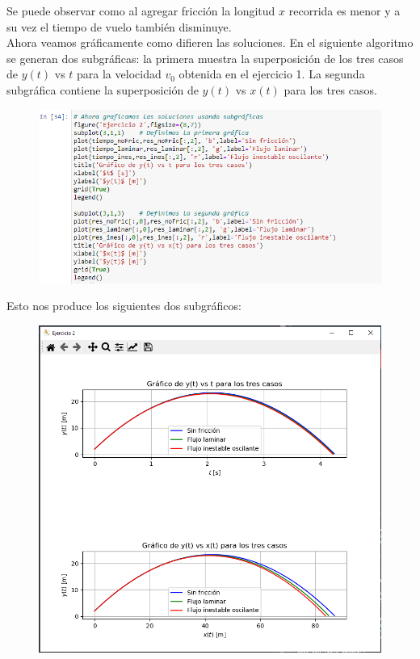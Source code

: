 \documentclass[11pt]{article}
\begin{document}
	Se puede observar como al agregar fricción la longitud $x$ recorrida es menor y a su vez el tiempo de vuelo también disminuye. \\
	Ahora veamos gráficamente como difieren las soluciones. En el siguiente algoritmo se generan dos subgráficas: la primera muestra la superposición de los tres casos de $y(t)$ vs $t$ para la velocidad $v_0$ obtenida en el ejercicio 1. La segunda subgráfica contiene la superposición de $y(t)$ vs $x(t)$ para los tres casos. 
\newpage
	\begin{figure}[h!]
		\centering
		\includegraphics[width=12cm]{Img/11.PNG}
	\end{figure}
	Esto nos produce los siguientes dos subgráficos:
	\begin{figure}[h!]
		\centering
		\includegraphics[width=12cm]{Img/12.PNG}
	\end{figure}
\end{document}
